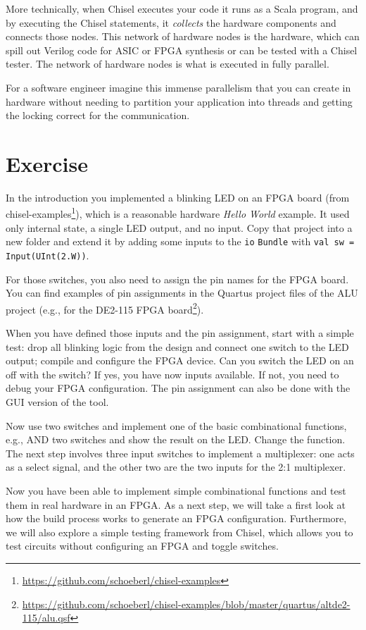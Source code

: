 \documentclass[%
    10pt,
    headinclude, footexclude,
    openright, %
    notitlepage,
    cleardoubleempty,
    headsepline,
    pointlessnumbers,
    bibtotoc, idxtotoc,
    ]{scrbook}
\newcommand{\code}[1]{{\small{\texttt{#1}}}}
\newcommand{\myref}[2]{\href{#1}{#2}}
\renewcommand{\myref}[2]{{#2}{\footnote{\url{#1}}}}
\begin{document}
More technically, when Chisel executes your code it runs as a Scala program, and
by executing the Chisel statements, it \emph{collects} the hardware components
and connects those nodes. This network of hardware nodes is the hardware,
which can spill out Verilog code for ASIC or FPGA synthesis or can be
tested with a Chisel tester.
The network of hardware nodes is what is executed in fully parallel.

For a software engineer imagine this immense parallelism that you can
create in hardware without needing to partition your application into threads
and getting the locking correct for the communication.


\section{Exercise}

In the introduction you implemented a blinking LED on an FPGA board
(from \myref{https://github.com/schoeberl/chisel-examples}{chisel-examples}), which is a reasonable
hardware \emph{Hello World} example. It used only internal state, a single LED output, and no input.
Copy that project into a new folder and extend it by adding some inputs to the \code{io} \code{Bundle}
with \code{val sw = Input(UInt(2.W))}.


\noindent For those switches, you also need to assign the pin names for the FPGA board.
You can find examples of pin assignments in the Quartus project files of the ALU project
(e.g., for the \myref{https://github.com/schoeberl/chisel-examples/blob/master/quartus/altde2-115/alu.qsf}{DE2-115
FPGA board}).

When you have defined those inputs and the pin assignment, start with a simple test:
drop all blinking logic from the design and connect one switch to the LED output;
compile and configure the FPGA device. Can you switch the LED on an off with the switch?
If yes, you have now inputs available. If not, you need to debug your FPGA configuration.
The pin assignment can also be done with the GUI version of the tool.

Now use two switches and implement one of the basic combinational functions,
e.g., AND two switches and show the result on the LED. Change the function.
The next step involves three input switches to implement a multiplexer: one acts as
a select signal, and the other two are the two inputs for the 2:1 multiplexer.

Now you have been able to implement simple combinational functions and test them
in real hardware in an FPGA. As a next step, we will take a first look at how the build
process works to generate an FPGA configuration. Furthermore, we will also
explore a simple testing framework from Chisel, which allows you to test circuits
without configuring an FPGA and toggle switches.
\end{document}

